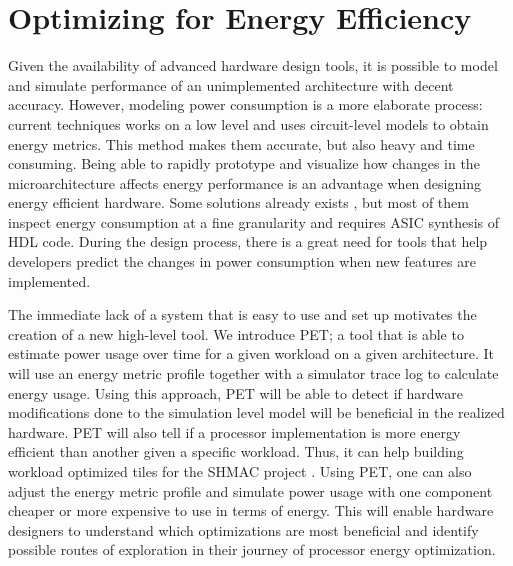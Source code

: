 \section{Optimizing for Energy Efficiency}

Given the availability of advanced hardware design tools, it is possible to
model and simulate performance of an unimplemented architecture with decent
accuracy. However, modeling power consumption is a more elaborate process:
current techniques works on a low level and uses circuit-level models to obtain
energy metrics. This method makes them accurate, but also heavy and time
consuming. Being able to rapidly prototype and visualize how changes in the
microarchitecture affects energy performance is an advantage when designing
energy efficient hardware. Some solutions already exists
\cite{bruno2005rtl,ponomarev2002accupower}, but most of them inspect energy
consumption at a fine granularity and requires ASIC synthesis of HDL code.
During the design process, there is a great need for tools that help developers
predict the changes in power consumption when new features are implemented.

The immediate lack of a system that is easy to use and set up motivates the
creation of a new high-level tool. We introduce PET; a tool that is able to
estimate power usage over time for a given workload on a given architecture. It
will use an energy metric profile together with a simulator trace log to
calculate energy usage. Using this approach, PET will be able to detect if
hardware modifications done to the simulation level model will be beneficial in
the realized hardware. PET will also tell if a processor implementation is more
energy efficient than another given a specific workload. Thus, it can help
building workload optimized tiles for the SHMAC project \cite{shmacwebpage}.
Using PET, one can also adjust the energy metric profile and simulate power
usage with one component cheaper or more expensive to use in terms of energy.
This will enable hardware designers to understand which optimizations are most
beneficial and identify possible routes of exploration in their journey of
processor energy optimization.

